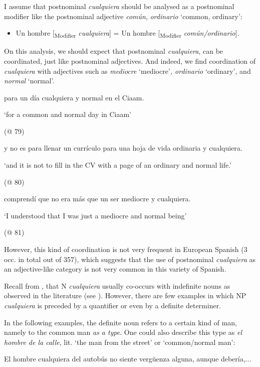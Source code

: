 \documentclass[output=paper]{langscibook}
\begin{document}
I assume that postnominal \textit{cualquiera} should be analysed as a postnominal modifier like the postnominal adjective \textit{común}, \textit{ordinario} ‘common, ordinary’:

\begin{itemize}
\item Un hombre [\textsubscript{Modifier} \textit{cualquiera}] = Un hombre [\textsubscript{Modifier} \textit{común/ordinario}]. 
\end{itemize}

On this analysis, we should expect that postnominal \textit{cualquiera}, can be coordinated, just like postnominal adjectives. And indeed, we find coordination of \textit{cualquiera} with adjectives such as \textit{mediocre} ‘mediocre’\textit{, ordinario} ‘ordinary’, and \textit{normal} ‘normal’.

  para un día cualquiera y normal en el Ciaam. 

  ‘for a common and normal day in Ciaam’

  (@ 79)

  y no es para llenar un currículo para una hoja de vida ordinaria y cualquiera.

  ‘and it is not to fill in the CV with a page of an ordinary and normal life.’

  (@ 80)

  comprendí que no era más que un ser mediocre y cualquiera. 

  ‘I understood that I was just a mediocre and normal being’

  (@ 81)

However, this kind of coordination is not very frequent in European Spanish (3 occ. in total out of 357), which suggests that the use of postnominal \textit{cualquiera} as an adjective-like category is not very common in this variety of Spanish.

  Recall from , that N \textit{cualquiera} usually co-occurs with indefinite nouns as observed in the literature (see ). However, there are few examples in which NP \textit{cualquiera} is preceded by a quantifier or even by a definite determiner.

  In the following examples, the definite noun refers to a certain kind of man, namely to the common man \textit{as a type}. One could also describe this type as \textit{el hombre de la calle}, lit. ‘the man from the street’ or ‘common/normal man’:

  El hombre cualquiera del autobús no siente vergüenza alguna, aunque debería,...
\end{document}
